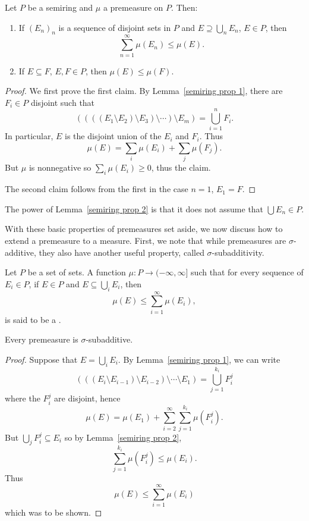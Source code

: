 \begin{lemma}\label{semiring prop 2}
Let $P$ be a semiring and $\mu$ a premeasure on $P$. Then:
\begin{enumerate}
\item If ${(E_{n})}_{n}$ is a sequence of disjoint sets in $P$ and $E \supseteq \bigcup_{n} E_{n}$, $E \in P$, then
\[\sum_{n=1}^{\infty} \mu(E_{n}) \leq \mu(E).\]
\item If $E \subseteq F$, $E, F \in P$, then $\mu(E) \leq \mu(F)$.
\end{enumerate}
\end{lemma}
\begin{proof}
We first prove the first claim. By Lemma~\ref{semiring prop 1}, there are $F_{i} \in P$ disjoint such that
\[((((E_{1} \setminus E_{2}) \setminus E_{3}) \setminus \cdots) \setminus E_{m}) = \bigcup_{i=1}^{n} F_{i}.\]
In particular, $E$ is the disjoint union of the $E_{i}$ and $F_{i}$. Thus
\[\mu(E) = \sum_{i} \mu(E_{i}) + \sum_{j} \mu(F_{j}).\]
But $\mu$ is nonnegative so $\sum_{i} \mu(E_{i}) \geq 0$, thus the claim.

The second claim follows from the first in the case $n = 1$, $E_{1} = F$.
\end{proof}

\begin{subsec}
The power of Lemma~\ref{semiring prop 2} is that it does not assume that $\bigcup E_{n} \in P$.
\end{subsec}

\begin{subsec}
With these basic properties of premeasures set aside, we now discuss how to extend a premeasure to a measure.
First, we note that while premeasures are $\sigma$-additive, they also have another useful property, called $\sigma$-subadditivity.
\end{subsec}

\begin{definition}
Let $P$ be a set of sets. A function $\mu: P \to (-\infty, \infty]$ such that for every sequence of $E_{i} \in P$, if $E \in P$ and $E \subseteq \bigcup_{i} E_{i}$, then
\[\mu(E) \leq \sum_{i=1}^{\infty} \mu(E_{i}),\]
is said to be a .
\end{definition}

\begin{lemma}
Every premeasure is $\sigma$-subadditive.
\end{lemma}
\begin{proof}
Suppose that $E = \bigcup_{i} E_{i}$. By Lemma~\ref{semiring prop 1}, we can write
\[(((E_{i} \setminus E_{i-1}) \setminus E_{i-2}) \setminus \cdots \setminus E_{1}) = \bigcup_{j=1}^{k_{i}} F_{i}^{j}\]
where the $F_{i}^{j}$ are disjoint, hence
\[\mu(E) = \mu(E_{1}) + \sum_{i=2}^{\infty} \sum_{j=1}^{k_{i}} \mu(F_{i}^{j}).\]
But $\bigcup_{j} F_{i}^{j} \subseteq E_{i}$ so by Lemma~\ref{semiring prop 2},
\[\sum_{j=1}^{k_{i}} \mu(F_{i}^{j}) \leq \mu(E_{i}).\]
Thus
\[\mu(E) \leq \sum_{i=1}^{\infty} \mu(E_{i})\]
which was to be shown.
\end{proof}

